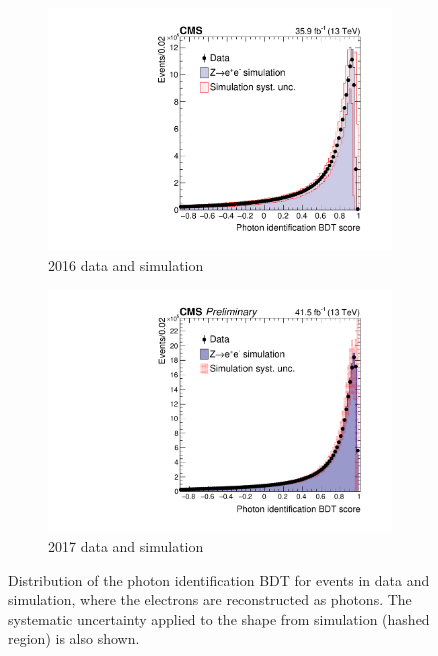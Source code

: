 \begin{figure}[h!]
  \centering
  \begin{subfigure}{0.49\textwidth}
    \includegraphics[width=\textwidth]{Figures/Objects/IDMVAZee_2016}
    \caption{2016 data and simulation}
    \label{fig:obj_IDMVAZee_2016}
  \end{subfigure}
  \begin{subfigure}{0.49\textwidth}
    \includegraphics[width=\textwidth]{Figures/Objects/IDMVAZee_2017}
    \caption{2017 data and simulation}
    \label{fig:obj_IDMVAZee_2016}
  \end{subfigure}
  \caption{Distribution of the photon identification BDT
  for \Zee events in data and simulation, where the electrons are reconstructed as
  photons. The systematic uncertainty applied to the shape from simulation (hashed region) is
  also shown.}
  \label{fig:obj_IDMVAZee}
\end{figure}

